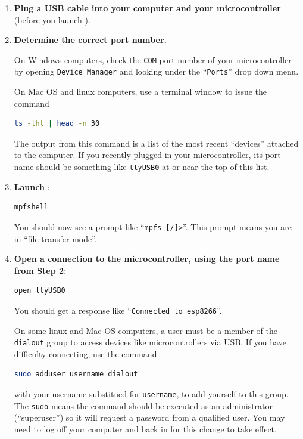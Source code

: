 \begin{enumerate}
\item \textbf{Plug a USB cable into your computer and your microcontroller} (before you launch \mpfshell). 
\item \textbf{Determine the correct port number.}

	On Windows computers, check the \texttt{COM} port number of your microcontroller by opening \texttt{Device Manager} and looking under the ``\texttt{Ports}'' drop down menu. 

	\smallskip
	On Mac OS and linux computers, use a terminal window to issue the command
\begin{lstlisting}[language=bash]
ls -lht | head -n 30
\end{lstlisting}
	The output from this command is a list of the most recent ``devices'' attached to the computer. 
	If you recently plugged in your microcontroller, its port name should be something like \texttt{ttyUSB0} at or near the top of this list.	
	\item \textbf{Launch \mpfshell}: 
\begin{lstlisting}[language=bash]
mpfshell
\end{lstlisting}
	You should now see a prompt like ``\verb|mpfs [/]>|''. 
	This prompt means you are in ``file transfer mode''. 
	\item \textbf{Open a connection to the microcontroller, using the port name from Step 2}:
\begin{lstlisting}[language=bash]
open ttyUSB0
\end{lstlisting}
	You should get a response like ``\texttt{Connected to esp8266}''.

	\smallskip
	On some linux and Mac OS computers, a user must be a member of the \texttt{dialout} group to access devices like microcontrollers via USB. 
	If you have difficulty connecting, use the command
\begin{lstlisting}[language=bash]
sudo adduser username dialout
\end{lstlisting}
	with your username substitued for \texttt{username}, to add yourself to this group. 
	The \texttt{sudo} means the command should be executed as an administrator (``superuser'') so it will request a password from a qualified user.
	You may need to log off your computer and back in for this change to take effect.
	

\end{enumerate}
